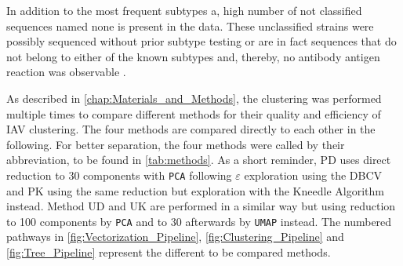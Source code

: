 
In addition to the most frequent subtypes a, high number of not classified sequences named \glqq none\grqq{} is present in the data. These unclassified strains were possibly sequenced without prior subtype testing or are in fact sequences that do not belong to either of the known subtypes and, thereby, no antibody antigen reaction was observable \autocite{noauthor_revision_1980}.

\vspace{1em}

As described in \autoref{chap:Materials_and_Methods}, the clustering was performed multiple times to compare different methods for their quality and efficiency of \gls{IAV} clustering. The four methods are compared directly to each other in the following. For better separation, the four methods were called by their abbreviation, to be found in \autoref{tab:methods}. As a short reminder, PD uses direct reduction to 30 components with \texttt{PCA} following $\varepsilon$ exploration using the \gls{DBCV} and PK using the same reduction but exploration with the Kneedle Algorithm instead. Method UD and UK are performed in a similar way but using reduction to 100 components by \texttt{PCA} and to 30 afterwards by \texttt{UMAP} instead. The numbered pathways in \autoref{fig:Vectorization_Pipeline}, \autoref{fig:Clustering_Pipeline} and \autoref{fig:Tree_Pipeline} represent the different to be compared methods.

